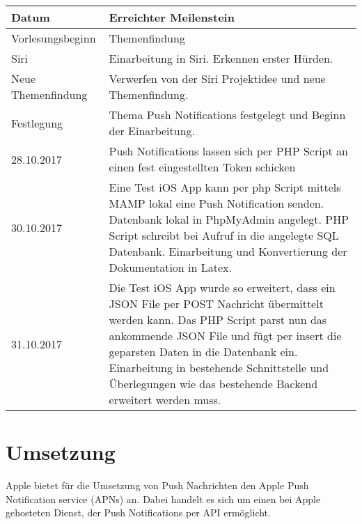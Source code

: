 \documentclass{article}
\begin{document}
\noindent%
\begin{tabularx}{\textwidth}{|p{}|X| }
\hline
\textbf{Datum} & \textbf{Erreichter Meilenstein}  \\ \hline 

Vorlesungsbeginn & Themenfindung \\ \hline

Siri & Einarbeitung in Siri. Erkennen erster Hürden. \\ \hline

Neue Themenfindung & Verwerfen von der Siri Projektidee und neue Themenfindung. \\ \hline

Festlegung & Thema Push Notifications festgelegt und Beginn der Einarbeitung. \\ \hline

28.10.2017 & Push Notifications lassen sich per PHP Script an einen fest eingestellten Token schicken \\ \hline

30.10.2017 & Eine Test iOS App kann per php Script mittels MAMP lokal eine Push Notification senden. \newline
Datenbank lokal in PhpMyAdmin angelegt. \newline
PHP Script schreibt bei Aufruf in die angelegte SQL Datenbank. \newline
Einarbeitung und Konvertierung der Dokumentation in Latex.
 \\ \hline
 31.10.2017 & Die Test iOS App wurde so erweitert, dass ein JSON File per POST Nachricht übermittelt werden kann.\newline
Das PHP Script parst nun das ankommende JSON File und fügt per insert die geparsten Daten in die Datenbank ein.\newline 
Einarbeitung in bestehende Schnittstelle und Überlegungen wie das bestehende Backend erweitert werden muss. 
 \\ \hline
 
 

\end{tabularx}

\newpage
\section{Umsetzung}

Apple bietet für die Umsetzung von Push Nachrichten den Apple Push Notification service (APNs) an. Dabei handelt es sich um einen bei Apple gehosteten Dienst, der Push Notifications per API ermöglicht.
\end{document}
